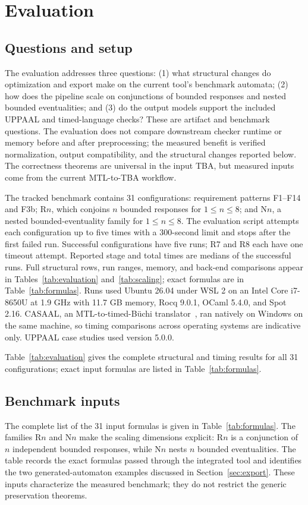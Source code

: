 \documentclass{ieeeaccess}
\begin{document}
\section{Evaluation}
\label{sec:evaluation}
\subsection{Questions and setup}
The evaluation addresses three questions: (1) what structural changes do optimization and export make on the current tool's benchmark automata; (2) how does the pipeline scale on conjunctions of bounded responses and nested bounded eventualities; and (3) do the output models support the included UPPAAL and timed-language checks? These are artifact and benchmark questions. The evaluation does not compare downstream checker runtime or memory before and after preprocessing; the measured benefit is verified normalization, output compatibility, and the structural changes reported below. The correctness theorems are universal in the input TBA, but measured inputs come from the current MTL-to-TBA workflow.

The tracked benchmark contains 31 configurations: requirement patterns F1--F14 and F3b; R$n$, which conjoins $n$ bounded responses for $1\le n\le8$; and N$n$, a nested bounded-eventuality family for $1\le n\le8$. The evaluation script attempts each configuration up to five times with a 300-second limit and stops after the first failed run. Successful configurations have five runs; R7 and R8 each have one timeout attempt. Reported stage and total times are medians of the successful runs. Full structural rows, run ranges, memory, and back-end comparisons appear in Tables~\ref{tab:evaluation} and~\ref{tab:scaling}; exact formulas are in Table~\ref{tab:formulas}. Runs used Ubuntu 26.04 under WSL 2 on an Intel Core i7-8650U at 1.9 GHz with 11.7 GB memory, Rocq 9.0.1, OCaml 5.4.0, and Spot 2.16. CASAAL, an MTL-to-timed-B\"uchi translator~\cite{casaal_tool}, ran natively on Windows on the same machine, so timing comparisons across operating systems are indicative only. UPPAAL case studies used version 5.0.0.

Table~\ref{tab:evaluation} gives the complete structural and timing results for all 31 configurations; exact input formulas are listed in Table~\ref{tab:formulas}.


\subsection{Benchmark inputs}
The complete list of the 31 input formulas is given in Table~\ref{tab:formulas}.
The families R$n$ and N$n$ make the scaling dimensions explicit: R$n$ is a
conjunction of $n$ independent bounded responses, while N$n$ nests $n$
bounded eventualities. The table records the exact formulas passed through
the integrated tool and identifies the two generated-automaton examples
discussed in Section~\ref{sec:export}. These inputs characterize the
measured benchmark; they do not restrict the generic preservation theorems.

\end{document}
